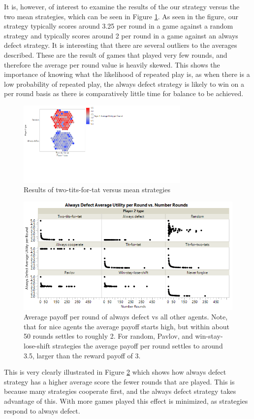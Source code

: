 \documentclass[a4paper]{article}
\begin{document}
It is, however, of interest to examine the results of the our strategy versus the two mean strategies, which can be seen in Figure \ref{fig:usvsmean}.  As seen in the figure, our strategy typically scores around 3.25 per round in a game against a random strategy and typically scores around 2 per round in a game against an always defect strategy.  It is interesting that there are several outliers to the averages described.  These are the result of games that played very few rounds, and therefore the average per round value is heavily skewed.  This shows the importance of knowing what the likelihood of repeated play is, as when there is a low probability of repeated play, the always defect strategy is likely to win on a per round basis as there is comparatively little time for balance to be achieved.

\begin{figure}
    \centering
    \includegraphics[clip, trim=0 4.3cm 9cm 0 ,width=0.75\textwidth]{images/usVsADRand.png}
    \caption{Results of two-tits-for-tat versus mean strategies}
    \label{fig:usvsmean}
\end{figure}

\begin{figure}
    \centering
    \includegraphics[width=\textwidth]{images/ADvsNRounds.png}
    \caption{Average payoff per round of always defect vs all other agents.  Note, that for nice agents the average payoff starts high, but within about 50 rounds settles to roughly 2. For random, Pavlov, and win-stay-lose-shift strategies the average payoff per round settles to around 3.5, larger than the reward payoff of 3.}
    \label{fig:advsrounds}
\end{figure}
This is very clearly illustrated in Figure \ref{fig:advsrounds} which shows how always defect strategy has a higher average score the fewer rounds that are played. This is because many strategies cooperate first, and the always defect strategy takes advantage of this. With more games played this effect is minimized, as strategies respond to always defect.
\end{document}
